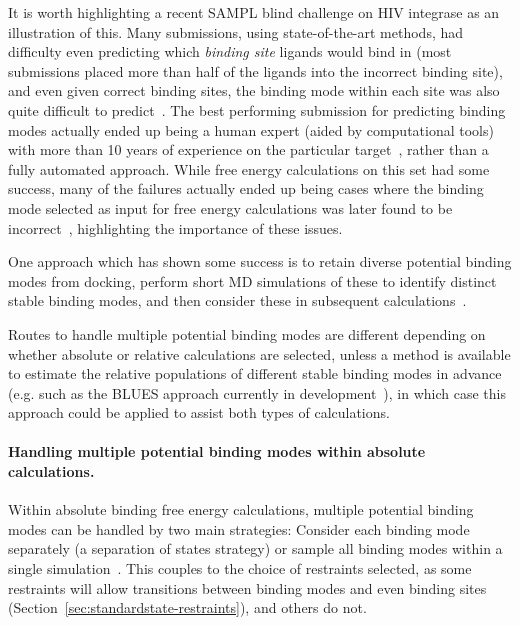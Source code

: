 \documentclass[9pt,bestpractices]{livecoms}
\begin{document}
It is worth highlighting a recent SAMPL blind challenge on HIV integrase as an illustration of this. 
Many submissions, using state-of-the-art methods, had difficulty even predicting which \emph{binding site} ligands would bind in (most submissions placed more than half of the ligands into the incorrect binding site), and even given correct binding sites, the binding mode within each site was also quite difficult to predict~\cite{Mobley:2014:J.Comput.AidedMol.Des.}.
The best performing submission for predicting binding modes actually ended up being a human expert (aided by computational tools) with more than 10 years of experience on the particular target~\cite{Voet:2014:JournalofComputer-AidedMolecularDesign}, rather than a fully automated approach.
While free energy calculations on this set had some success, many of the failures actually ended up being cases where the binding mode selected as input for free energy calculations was later found to be incorrect~\cite{Gallicchio:2014:JournalofComputer-AidedMolecularDesign}, highlighting the importance of these issues.

One approach which has shown some success is to retain diverse potential binding modes from docking, perform short MD simulations of these to identify distinct stable binding modes, and then consider these in subsequent calculations~\cite{Gallicchio:2014:JournalofComputer-AidedMolecularDesign, Mobley:2006:TheJournalofChemicalPhysics, Rocklin:2013:JournalofMolecularBiology, Boyce:2009:JournalofMolecularBiology, Mobley:2007:JournalofMolecularBiology}.

Routes to handle multiple potential binding modes are different depending on whether absolute or relative calculations are selected, unless a method is available to estimate the relative populations of different stable binding modes in advance (e.g. such as the BLUES approach currently in development~\cite{Gill:2018:J.Phys.Chem.B}), in which case this approach could be applied to assist both types of calculations.



\paragraph{Handling multiple potential binding modes within absolute calculations.}
Within absolute binding free energy calculations, multiple potential binding modes can be handled by two main strategies: Consider each binding mode separately (a separation of states strategy) or sample all binding modes within a single simulation~\cite{Mobley:2012:TheJournalofChemicalPhysics}.
This couples to the choice of restraints selected, as some restraints will allow transitions between binding modes and even binding sites (Section~\ref{sec:standardstate-restraints}), and others do not.
\end{document}
